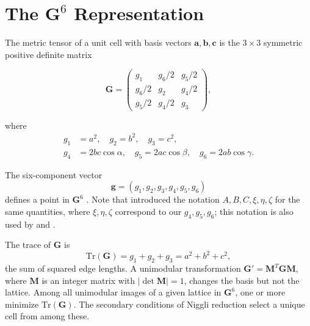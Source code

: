 \documentclass[preprint]{iucr}              %
\numberwithin{equation}{section}
\newcommand{\GVI}{\ensuremath{\mathbf{G}^{6}}}
\newcommand{\va}{\ensuremath{\mathbf{a}}}
\newcommand{\vb}{\ensuremath{\mathbf{b}}}
\newcommand{\vc}{\ensuremath{\mathbf{c}}}
\begin{document}
	
	\section{The \GVI{} Representation}
	\label{sec:g6}
	
	The metric tensor of a unit cell with basis vectors $\va, \vb, \vc$
	is the $3 \times 3$ symmetric positive definite matrix
	
	\begin{equation}
		\mathbf{G} = \begin{pmatrix}
			g_1      & g_6/2   & g_5/2 \\
			g_6/2   & g_2      & g_4/2 \\
			g_5/2   & g_4/2   & g_3
		\end{pmatrix},
		\label{eq:metrictensor}
	\end{equation}
	
	\noindent where
	\begin{equation}
		\begin{aligned}
			g_1 &= a^2, \quad g_2 = b^2, \quad g_3 = c^2, \\
			g_4 &= 2bc\cos\alpha, \quad g_5 = 2ac\cos\beta, \quad g_6 = 2ab\cos\gamma.
		\end{aligned}
		\label{eq:g6components}
	\end{equation}
	
	\noindent The six-component vector
	\begin{equation}
		\mathbf{g} = (g_1, g_2, g_3, g_4, g_5, g_6)
		\label{eq:g6vector}
	\end{equation}
	defines a point in \GVI{} \cite{Andrews2014}. Note that  introduced the notation
	$A, B, C, \xi, \eta, \zeta$ for the same quantities, where
	$\xi, \eta, \zeta$ correspond to our $g_4, g_5, g_6$; this
	notation is also used by  and
	.
	
	The trace of $\mathbf{G}$ is
	\begin{equation}
		\mathrm{Tr}(\mathbf{G}) = g_1 + g_2 + g_3 = a^2 + b^2 + c^2,
		\label{eq:trace}
	\end{equation}
	the sum of squared edge lengths. A unimodular transformation
	$\mathbf{G}' = \mathbf{M}^T \mathbf{G} \mathbf{M}$, where $\mathbf{M}$
	is an integer matrix with $|\det \mathbf{M}| = 1$, changes the basis
	but not the lattice. Among all unimodular images of a given lattice in
	\GVI{}, one or more minimize $\mathrm{Tr}(\mathbf{G})$. The secondary
	conditions of Niggli reduction select a unique cell from among these.
	
\end{document}

